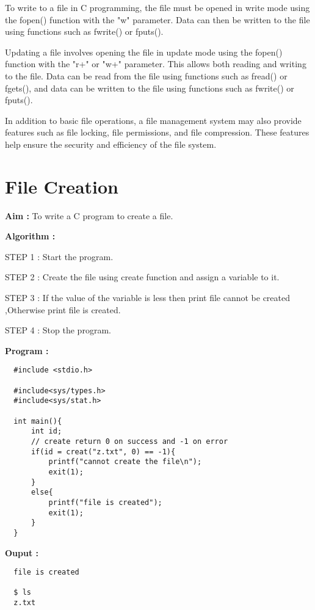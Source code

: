 \documentclass[journal,onecolumn]{IEEEtran}
\begin{document}
To write to a file in C programming, the file must be opened in write mode using the fopen() function with the "w" parameter. Data can then be written to the file using functions such as fwrite() or fputs().

Updating a file involves opening the file in update mode using the fopen() function with the "r+" or "w+" parameter. This allows both reading and writing to the file. Data can be read from the file using functions such as fread() or fgets(), and data can be written to the file using functions such as fwrite() or fputs().

In addition to basic file operations, a file management system may also provide features such as file locking, file permissions, and file compression. These features help ensure the security and efficiency of the file system.



\section{File Creation}
\textbf{Aim : } To write a C program to create a file.

\textbf{Algorithm : }
\begin{list}{}{}
  \item STEP 1 : Start the program.
  \item STEP 2 : Create the file using create function and assign a variable to it.
  \item STEP 3 : If the value of the variable is less then print file cannot be created ,Otherwise print file is created.
  \item STEP 4 : Stop the program.
\end{list}

\textbf{Program : }
\begin{verbatim}
  #include <stdio.h>

  #include<sys/types.h>
  #include<sys/stat.h>
  
  int main(){
      int id;
      // create return 0 on success and -1 on error
      if(id = creat("z.txt", 0) == -1){
          printf("cannot create the file\n");
          exit(1);
      }
      else{
          printf("file is created");
          exit(1);
      }
  }
\end{verbatim}

\textbf{Ouput :}
\begin{verbatim}
  file is created

  $ ls 
  z.txt
\end{verbatim}
\end{document}
